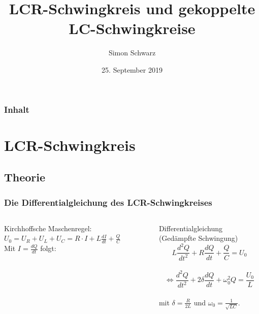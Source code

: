 \documentclass{beamer}
\title[Elektrizitätslehre]{LCR-Schwingkreis und gekoppelte LC-Schwingkreise}
\author{Simon Schwarz}
\institute{Grundpraktikum Physik Teil I}
\date{25. September 2019}
\begin{document}
\begin{frame}
\titlepage
\end{frame}

\begin{frame}
\frametitle{Inhalt}
\tableofcontents
\end{frame}


\section{LCR-Schwingkreis}
\subsection{Theorie}

\begin{frame}
\frametitle{Die Differentialgleichung des LCR-Schwingkreises}

\begin{columns}[c]

Kirchhoffsche Maschenregel: $U_0 = U_R + U_L + U_C = R\cdot I + L\frac{dI}{dt} + \frac{Q}{C}$ \\
Mit $I = \frac{dQ}{dt}$ folgt:
\begin{block}{Differentialgleichung (Gedämpfte Schwingung)}
$$L\frac{d^2Q}{dt^2} + R \frac{dQ}{dt} + \frac{Q}{C} = U_0$$ \\
$$\Leftrightarrow \frac{d^2Q}{dt^2} + 2\delta \frac{dQ}{dt} + \omega_0^2Q = \frac{U_0}{L}$$ \\
mit $\delta = \frac{R}{2L}$ und $\omega_0 = \frac{1}{\sqrt{LC}}$.
\end{block}


\end{columns}
\end{frame}
\end{document}
